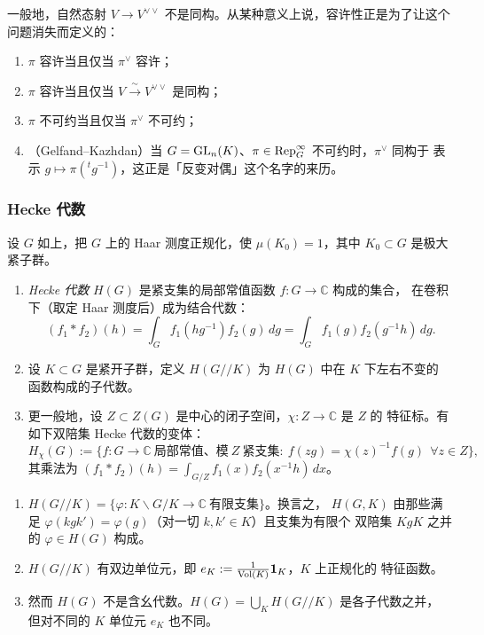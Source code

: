 \begin{remark}
一般地，自然态射 $V\to V^{\vee\vee}$ 不是同构。从某种意义上说，容许性正是为了让这个
问题消失而定义的：
\begin{enumerate}[label=(\arabic*),leftmargin=2.2em]
\item $\pi$ 容许当且仅当 $\pi^{\vee}$ 容许；
\item $\pi$ 容许当且仅当 $V\xrightarrow{\ \sim\ }V^{\vee\vee}$ 是同构；
\item $\pi$ 不可约当且仅当 $\pi^{\vee}$ 不可约；
\item （Gelfand--Kazhdan）当 $G=\mathrm{GL}_n(K)$、$\pi\in\mathrm{Rep}^{\infty}_G$ 不可约时，$\pi^{\vee}$ 同构于
      表示 $g\mapsto\pi({}^{t}g^{-1})$，这正是「反变对偶」这个名字的来历。
\end{enumerate}
\end{remark}

\subsubsection{Hecke 代数}

\begin{definition}
设 $G$ 如上，把 $G$ 上的 Haar 测度正规化，使 $\mu(K_0)=1$，其中 $K_0\subset G$ 是极大紧子群。
\begin{enumerate}[label=(\arabic*),leftmargin=2.2em]
\item \emph{Hecke 代数} $H(G)$ 是紧支集的局部常值函数 $f\colon G\to\mathbb{C}$ 构成的集合，
      在卷积下（取定 Haar 测度后）成为结合代数：
\[
(f_1*f_2)(h)=\int_G f_1(hg^{-1})f_2(g)\,dg=\int_G f_1(g)f_2(g^{-1}h)\,dg .
\]
\item 设 $K\subset G$ 是紧开子群，定义 $H(G/\!/K)$ 为 $H(G)$ 中在 $K$ 下左右不变的
      函数构成的子代数。
\item 更一般地，设 $Z\subset Z(G)$ 是中心的闭子空间，$\chi\colon Z\to\mathbb{C}$ 是 $Z$ 的
      特征标。有如下双陪集 Hecke 代数的变体：
\[
H_{\chi}(G):=\bigl\{f\colon G\to\mathbb{C}\ \text{局部常值、模}\ Z\ \text{紧支集}:\ 
f(zg)=\chi(z)^{-1}f(g)\ \ \forall z\in Z\bigr\},
\]
其乘法为 $(f_1*f_2)(h)=\int_{G/Z}f_1(x)f_2(x^{-1}h)\,dx$。
\end{enumerate}
\end{definition}

\begin{remark}
\leavevmode
\begin{enumerate}[label=(\arabic*),leftmargin=2.2em]
\item $H(G/\!/K)=\{\varphi\colon K\backslash G/K\to\mathbb{C}\ \text{有限支集}\}$。换言之，
      $H(G,K)$ 由那些满足 $\varphi(kgk')=\varphi(g)$（对一切 $k,k'\in K$）且支集为有限个
      双陪集 $KgK$ 之并的 $\varphi\in H(G)$ 构成。
\item $H(G/\!/K)$ 有双边单位元，即 $e_K:=\frac{1}{\operatorname{Vol}(K)}\mathbf{1}_K$，$K$ 上正规化的
      特征函数。
\item 然而 $H(G)$ 不是含幺代数。$H(G)=\bigcup_K H(G/\!/K)$ 是各子代数之并，
      但对不同的 $K$ 单位元 $e_K$ 也不同。
\end{enumerate}
\end{remark}

